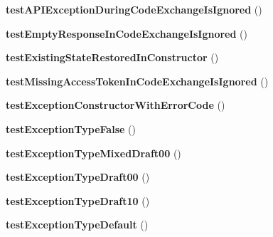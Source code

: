 \begin{DoxyCompactItemize}
\item 
\hypertarget{classPHPSDKTestCase_a92aee8b6b6deca395fe1029c8b7350d4}{{\bfseries test\-A\-P\-I\-Exception\-During\-Code\-Exchange\-Is\-Ignored} ()}\label{classPHPSDKTestCase_a92aee8b6b6deca395fe1029c8b7350d4}

\item 
\hypertarget{classPHPSDKTestCase_ac4ee09e7314459103236a986f78243f1}{{\bfseries test\-Empty\-Response\-In\-Code\-Exchange\-Is\-Ignored} ()}\label{classPHPSDKTestCase_ac4ee09e7314459103236a986f78243f1}

\item 
\hypertarget{classPHPSDKTestCase_ac5c437c3b1dce46c9c45ab672c366d8b}{{\bfseries test\-Existing\-State\-Restored\-In\-Constructor} ()}\label{classPHPSDKTestCase_ac5c437c3b1dce46c9c45ab672c366d8b}

\item 
\hypertarget{classPHPSDKTestCase_a28f5a53345ec07b83ae8d871db80b831}{{\bfseries test\-Missing\-Access\-Token\-In\-Code\-Exchange\-Is\-Ignored} ()}\label{classPHPSDKTestCase_a28f5a53345ec07b83ae8d871db80b831}

\item 
\hypertarget{classPHPSDKTestCase_a3709e180a03ebad35f1aac95e270ddbb}{{\bfseries test\-Exception\-Constructor\-With\-Error\-Code} ()}\label{classPHPSDKTestCase_a3709e180a03ebad35f1aac95e270ddbb}

\item 
\hypertarget{classPHPSDKTestCase_abda2a4db927712b261470d09e4dd3265}{{\bfseries test\-Exception\-Type\-False} ()}\label{classPHPSDKTestCase_abda2a4db927712b261470d09e4dd3265}

\item 
\hypertarget{classPHPSDKTestCase_a02604f91b7a0b36d8c6318ca6eb2323e}{{\bfseries test\-Exception\-Type\-Mixed\-Draft00} ()}\label{classPHPSDKTestCase_a02604f91b7a0b36d8c6318ca6eb2323e}

\item 
\hypertarget{classPHPSDKTestCase_a98a8239bf82dc2de60c1c61729ea4b3b}{{\bfseries test\-Exception\-Type\-Draft00} ()}\label{classPHPSDKTestCase_a98a8239bf82dc2de60c1c61729ea4b3b}

\item 
\hypertarget{classPHPSDKTestCase_a7c587cbf34510834c933d93ca08fb8af}{{\bfseries test\-Exception\-Type\-Draft10} ()}\label{classPHPSDKTestCase_a7c587cbf34510834c933d93ca08fb8af}

\item 
\hypertarget{classPHPSDKTestCase_a0154b5fb963b822d1dcebd152037c2b4}{{\bfseries test\-Exception\-Type\-Default} ()}\label{classPHPSDKTestCase_a0154b5fb963b822d1dcebd152037c2b4}


\end{DoxyCompactItemize}
